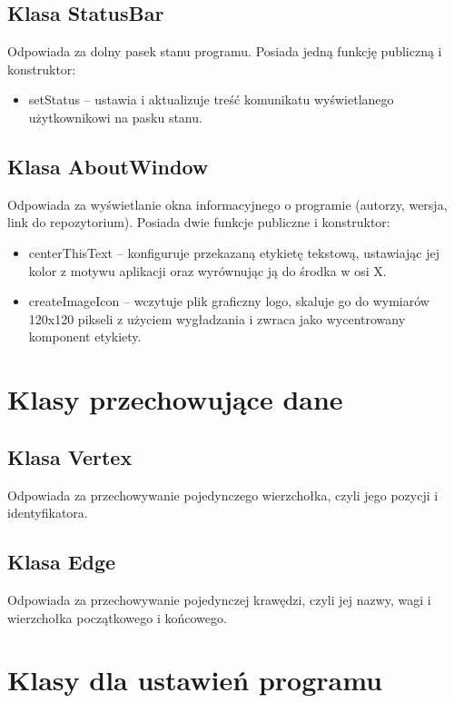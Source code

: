 \documentclass[]{article}
\begin{document}
    \subsection{Klasa StatusBar}
   Odpowiada za dolny pasek stanu programu. Posiada jedną funkcję publiczną i konstruktor:
    \begin{itemize}
        \item setStatus -- ustawia i aktualizuje treść komunikatu wyświetlanego użytkownikowi na pasku stanu.
    \end{itemize}

    \subsection{Klasa AboutWindow}

    Odpowiada za wyświetlanie okna informacyjnego o programie (autorzy, wersja, link do repozytorium). Posiada dwie funkcje publiczne i konstruktor:

    \begin{itemize}
        \item centerThisText -- konfiguruje przekazaną etykietę tekstową, ustawiając jej kolor z motywu aplikacji oraz wyrównując ją do środka w osi X.
        \item createImageIcon -- wczytuje plik graficzny logo, skaluje go do wymiarów 120x120 pikseli z użyciem wygładzania i zwraca jako wycentrowany komponent etykiety.
    \end{itemize}

    \section{Klasy przechowujące dane}

    \subsection{Klasa Vertex} 
    Odpowiada za przechowywanie pojedynczego wierzchołka, czyli jego pozycji i identyfikatora.

    \subsection{Klasa Edge}
    Odpowiada za przechowywanie pojedynczej krawędzi, czyli jej nazwy, wagi i wierzchołka początkowego i końcowego.

    \section{Klasy dla ustawień programu}
\end{document}
